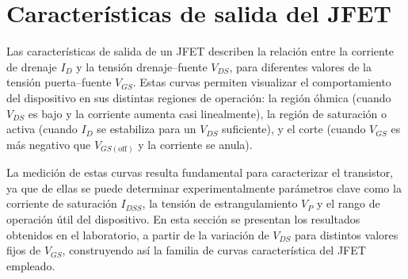 \chapter{Características de salida del JFET}
Las características de salida de un JFET describen la relación entre la corriente de drenaje $I_D$ y la tensión
drenaje–fuente $V_{DS}$, para diferentes valores de la tensión puerta–fuente $V_{GS}$. Estas curvas permiten visualizar
el comportamiento del dispositivo en sus distintas regiones de operación: la región óhmica (cuando $V_{DS}$ es bajo y la
corriente aumenta casi linealmente), la región de saturación o activa (cuando $I_D$ se estabiliza para un $V_{DS}$
suficiente), y el corte (cuando $V_{GS}$ es más negativo que $V_{GS(\text{off})}$ y la corriente se anula).

\lipsum[1]

La medición de estas curvas resulta fundamental para caracterizar el transistor, ya que de ellas se puede determinar
experimentalmente parámetros clave como la corriente de saturación $I_{DSS}$, la tensión de estrangulamiento $V_P$ y el
rango de operación útil del dispositivo. En esta sección se presentan los resultados obtenidos en el laboratorio, a
partir de la variación de $V_{DS}$ para distintos valores fijos de $V_{GS}$, construyendo así la familia de curvas
característica del JFET empleado.

